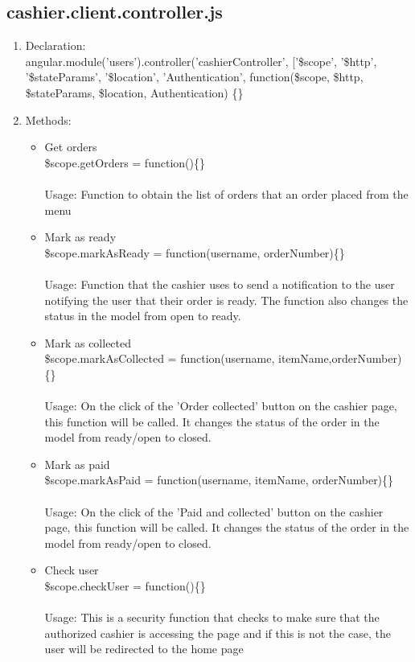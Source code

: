 \documentclass[a4paper,12pt]{article}
\begin{document}
\subsection{cashier.client.controller.js}
\begin{enumerate}
\item Declaration: \\ angular.module('users').controller('cashierController', ['\$scope', '\$http', '\$stateParams', '\$location', 'Authentication',
	function(\$scope, \$http, \$stateParams, \$location, Authentication) \{\}
\item Methods:
	\begin{itemize}
		\item Get orders \\ \$scope.getOrders = function()\{\}
		\\ \\ Usage: Function to obtain the list of orders that an order placed from the menu
		\item Mark as ready \\ \$scope.markAsReady = function(username, orderNumber)\{\}
		\\ \\ Usage: Function that the cashier uses to send a notification to the user notifying the user that their order is ready. The function also changes the status in the model from open to ready.
	\item Mark as collected \\ \$scope.markAsCollected = function(username, itemName,orderNumber)\{\}
	\\ \\ Usage: On the click of the 'Order collected' button on the cashier page, this function will be called. It changes the status of the order in the model from ready/open to closed.
	\item Mark as paid \\ \$scope.markAsPaid = function(username, itemName, orderNumber)\{\}
	\\ \\ Usage: On the click of the 'Paid and collected' button on the cashier page, this function will be called. It changes the status of the order in the model from ready/open to closed.
	\item Check user \\ \$scope.checkUser = function()\{\}
	\\ \\ Usage: This is a security function that checks to make sure that the authorized cashier is accessing the page and if this is not the case, the user will be redirected to the home page
	\end{itemize}	
\end{enumerate}
\end{document}
